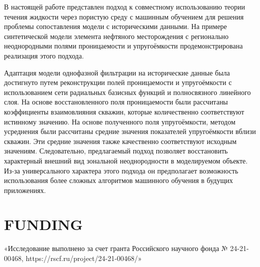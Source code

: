 \documentclass{article}
\begin{document}
В настоящей работе представлен подход к совместному использованию теории течения жидкости через пористую среду с машинным обучением для решения проблемы сопоставления модели с историческими данными. На примере синтетической модели элемента нефтяного месторождения с регионально неоднородными полями проницаемости и упругоёмкости продемонстрирована реализация этого подхода.

Адаптация модели однофазной фильтрации на исторические данные была достигнуто путем реконструкции полей проницаемости и упругоёмкости с использованием сети радиальных базисных функций и полносвязного линейного слоя. На основе восстановленного поля проницаемости были рассчитаны коэффициенты взаимовлияния скважин, которые количественно соответствуют истинному значению. На основе полученного поля упругоёмкости, методом усреднения были рассчитаны средние значения показателей упругоёмкости вблизи скважин. Эти средние значения также качественно соответствуют исходным значениям. Следовательно, предлагаемый подход позволяет восстановить характерный внешний вид зональной неоднородности в моделируемом объекте. Из-за универсального характера этого подхода он предполагает возможность использования более сложных алгоритмов машинного обучения в будущих приложениях.

\section{FUNDING}
«Исследование выполнено за счет гранта Российского научного фонда № 24-21-00468,
 https://rscf.ru/project/24-21-00468/»
 
\end{document}
